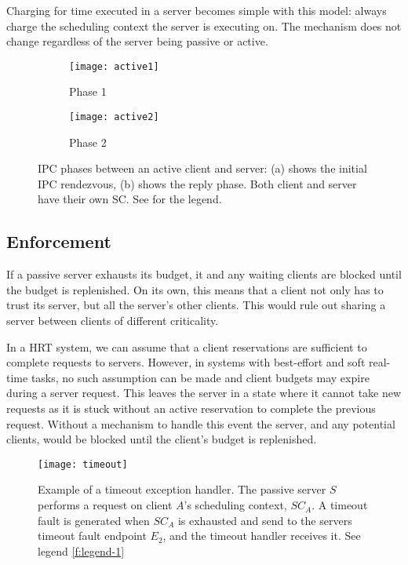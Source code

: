 Charging for time executed in a server becomes simple with this model: always charge the scheduling
context the server is executing on. The mechanism does not change regardless of the server being passive or
active. 

\begin{figure}
    \centering
    \begin{subfigure}[h]{0.48\textwidth}
        \centering
        \texttt{[image: active1]}
        \caption{Phase 1}
        \label{f:ipc1}
    \end{subfigure}%
    \begin{subfigure}[h]{0.48\textwidth}
        \centering
        \texttt{[image: active2]}
        \caption{Phase 2}
        \label{f:ipc2}
    \end{subfigure}
    \label{f:active}
    \caption{IPC phases between an active client and server: (a) shows the initial IPC rendezvous, (b) shows the
    reply phase. Both client and server have their own SC. See  for the legend.}
\end{figure}

\subsection{Enforcement}

If a passive server exhausts its budget, it and any waiting clients
are blocked until the budget is replenished. On its own, this means that a client
not only has to trust its server, but all the server's other
clients. This would rule out sharing a server between clients of
different criticality.

In a \gls{HRT} system, we can assume that a client reservations are sufficient to complete
requests to servers.  However, in systems with best-effort and soft real-time tasks, no such
assumption can be made and client budgets may expire during a server request.  This leaves the
server in a state where it cannot take new requests as it is stuck without an active reservation to
complete the previous request.  Without a mechanism to handle this event the server, and any
potential clients, would be blocked until the client's budget is replenished.

\begin{figure}
    \centering
    \texttt{[image: timeout]}
    \caption{Example of a timeout exception handler. The passive server $S$ performs a request on
    client $A$'s scheduling context, $SC_{A}$. A timeout fault is generated when $SC_{A}$ is
exhausted and send to the servers timeout fault endpoint $E_{2}$, and the timeout handler receives it. See legend \cref{f:legend-1}}
    \label{f:timeout}
\end{figure}

